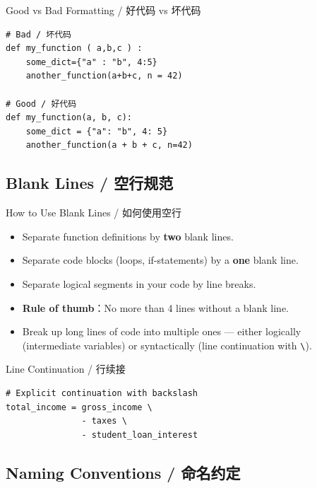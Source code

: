 \documentclass[11pt,a4paper]{article}
\begin{document}
\begin{examplebox}{Good vs Bad Formatting / 好代码 vs 坏代码}
\begin{lstlisting}
# Bad / 坏代码
def my_function ( a,b,c ) :
    some_dict={"a" : "b", 4:5}
    another_function(a+b+c, n = 42)

# Good / 好代码
def my_function(a, b, c):
    some_dict = {"a": "b", 4: 5}
    another_function(a + b + c, n=42)
\end{lstlisting}
\end{examplebox}

\subsection{Blank Lines / 空行规范}

\begin{concept}{How to Use Blank Lines / 如何使用空行}
    \begin{itemize}[itemsep=0.5em]
        \item Separate function definitions by \textbf{two} blank lines.
        \item Separate code blocks (loops, if-statements) by a \textbf{one} blank line.
        \item Separate logical segments in your code by line breaks.
        \item \textbf{Rule of thumb}：No more than 4 lines without a blank line.
        \item Break up long lines of code into multiple ones — either logically (intermediate variables) or syntactically (line continuation with \texttt{\textbackslash}).
    \end{itemize}
\end{concept}

\begin{examplebox}{Line Continuation / 行续接}
\begin{lstlisting}
# Explicit continuation with backslash
total_income = gross_income \
               - taxes \
               - student_loan_interest
\end{lstlisting}
\end{examplebox}

\subsection{Naming Conventions / 命名约定}
\end{document}
